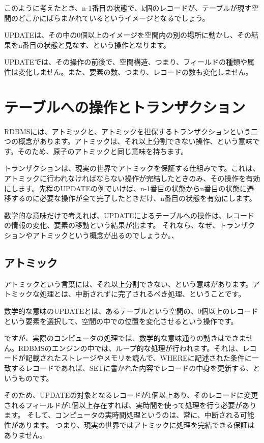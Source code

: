 このように考えたとき、n-1番目の状態で、k個のレコードが、テーブルが現す空間のどこかにばらまかれているというイメージとなるでしょう。

UPDATEは、その中の0個以上のイメージを空間内の別の場所に動かし、その結果をn番目の状態と見なす、という操作となります。

UPDATEでは、その操作の前後で、空間構造、つまり、フィールドの種類や属性は変化しません。また、要素の数、つまり、レコードの数も変化しません。

\section{テーブルへの操作とトランザクション}

RDBMSには、アトミックと、アトミックを担保するトランザクションという二つの概念があります。アトミックは、それ以上分割できない操作、という意味です。そのため、原子のアトミックと同じ意味を持ちます。

トランザクションは、現実の世界でアトミックを保証する仕組みです。これは、アトミックに行われなければならない操作が完結したときのみ、その操作を有効にします。先程のUPDATEの例でいけば、n-1番目の状態からn番目の状態に遷移するのに必要な操作が全て完了したときだけ、n番目の状態を有効にします。

数学的な意味だけで考えれば、UPDATEによるテーブルへの操作は、レコードの情報の変化、要素の移動という結果が出ます。
それなら、なぜ、トランザクションやアトミックという概念が出るのでしょうか。、

\subsection{アトミック}
アトミックという言葉には、それ以上分割できない、という意味があります。アトミックな処理とは、中断されずに完了されるべき処理、ということです。

数学的な意味のUPDATEとは、あるテーブルという空間の、0個以上のレコードという要素を選択して、空間の中での位置を変化させるという操作です。

ですが、実際のコンピュータの処理では、数学的な意味通りの動きはできません。RDBMSのエンジンの中では、ループ的な処理が行われます。それは、レコードが記載されたストレージやメモリを読んで、WHEREに記述された条件に一致するレコードであれば、SETに書かれた内容でレコードの中身を更新する、というものです。

そのため、UPDATEの対象となるレコードが1個以上あり、そのレコードに変更されるフィールドが1個以上存在すれば、実時間を使って処理を行う必要があります。
そして、コンピュータの実時間処理というのは、常に、中断される可能性があります。
つまり、現実の世界ではアトミックに処理を完結できる保証はありません。

